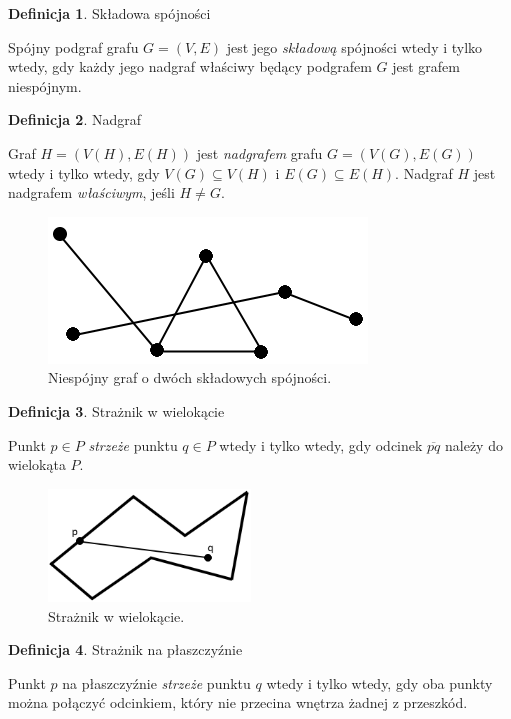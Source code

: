 \documentclass{xmgr}
\theoremstyle{definition}
\newtheorem{Definicja}{Definicja}
\begin{document}
\begin{Definicja}{Składowa spójności}

  Spójny podgraf grafu $G = (V,E)$ jest jego \emph{składową} spójności wtedy i tylko wtedy, gdy każdy jego nadgraf właściwy będący podgrafem $G$ jest grafem niespójnym.
\end{Definicja}

\begin{Definicja}{Nadgraf}

  Graf $H = (V(H), E(H))$ jest \emph{nadgrafem} grafu $G = (V(G), E(G))$ wtedy i tylko wtedy, gdy $V(G) \subseteq V(H)$ i $E(G) \subseteq E(H)$. Nadgraf $H$ jest nadgrafem \emph{właściwym}, jeśli $H \neq G$.
\end{Definicja}

\begin{figure}[ht!]
  \centering
  \includegraphics{rysunki/niespojny_graf.png}
  \caption{Niespójny graf o dwóch składowych spójności.}
\end{figure}

\begin{Definicja}{Strażnik w wielokącie}

  Punkt $p \in P$ \emph{strzeże} punktu $q \in P$ wtedy i tylko wtedy, gdy odcinek $\overline{pq}$ należy do wielokąta $P$.
\end{Definicja}

\begin{figure}[ht!]
  \centering
  \includegraphics[height=3cm]{rysunki/straznik_wielokat.png}
    \caption{Strażnik w wielokącie.}
\end{figure} 

\begin{Definicja}{Strażnik na płaszczyźnie}\label{straznik na plaszczyznie}
	
	Punkt $p$ na płaszczyźnie \emph{strzeże} punktu $q$ wtedy i tylko wtedy, gdy oba punkty można połączyć odcinkiem, który nie przecina wnętrza żadnej z przeszkód.
\end{Definicja}
\end{document}
